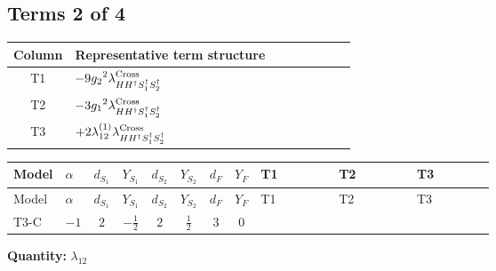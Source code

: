 \documentclass[8pt]{article}
\begin{document}
\begin{landscape}
\subsection*{Terms 2 of 4}
\begin{center}
\begin{tabular}{@{}c >{\raggedright\arraybackslash}p{0.82\linewidth}@{}}
\toprule
Column & Representative term structure \\
\midrule
T1 & \(\displaystyle -9 {g_2}^2 {\lambda_{H H^\dagger S_1^\dagger S_2^\dagger}^{\rm Cross}}\) \\
\midrule
T2 & \(\displaystyle -3 {g_1}^2 {\lambda_{H H^\dagger S_1^\dagger S_2^\dagger}^{\rm Cross}}\) \\
\midrule
T3 & \(\displaystyle +2 {\lambda_{12}^{(1)}} {\lambda_{H H^\dagger S_1^\dagger S_2^\dagger}^{\rm Cross}}\) \\
\midrule
\bottomrule
\end{tabular}
\end{center}
\smallskip
\tiny
\begin{longtable}{@{}llcccccc >{\raggedright\arraybackslash}p{0.21\linewidth} >{\raggedright\arraybackslash}p{0.21\linewidth} >{\raggedright\arraybackslash}p{0.21\linewidth}@{}}
\toprule
Model & $\alpha$ & $d_{S_1}$ & $Y_{S_1}$ & $d_{S_2}$ & $Y_{S_2}$ & $d_F$ & $Y_F$ & T1 & T2 & T3 \\
\midrule
\endfirsthead
\toprule
Model & $\alpha$ & $d_{S_1}$ & $Y_{S_1}$ & $d_{S_2}$ & $Y_{S_2}$ & $d_F$ & $Y_F$ & T1 & T2 & T3 \\
\midrule
\endhead
T3-C & $-1$ & $2$ & $-\frac{1}{2}$ & $2$ & $\frac{1}{2}$ & $3$ & $0$ & \scriptsize\adjustbox{max width=\linewidth}{$\begin{gathered} -9 {g_2}^2 {\lambda_{H H^\dagger S_1^\dagger S_2^\dagger}^{\rm Cross}}\end{gathered}$} & \scriptsize\adjustbox{max width=\linewidth}{$\begin{gathered} -3 {g_1}^2 {\lambda_{H H^\dagger S_1^\dagger S_2^\dagger}^{\rm Cross}}\end{gathered}$} & \scriptsize\adjustbox{max width=\linewidth}{$\begin{gathered} +2 {\lambda_{12}^{(1)}} {\lambda_{H H^\dagger S_1^\dagger S_2^\dagger}^{\rm Cross}}\end{gathered}$} \\
\midrule
\bottomrule
\end{longtable}
\clearpage
\noindent\textbf{Quantity: }$\lambda_{12}$\par\smallskip

\end{landscape}
\end{document}
